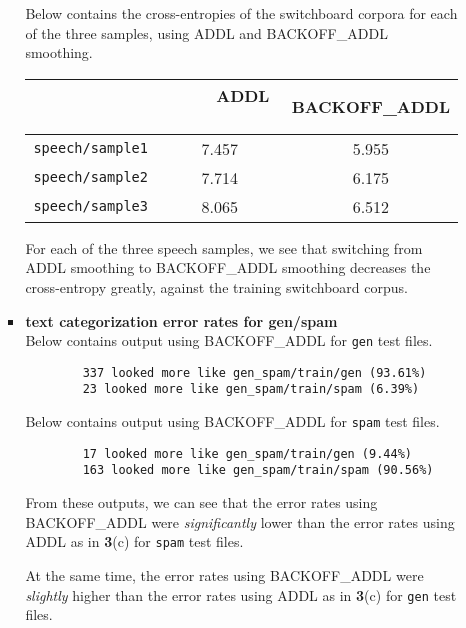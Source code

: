 \documentclass[11pt]{article}
\begin{document}
\begin{enumerate}
\begin{enumerate}[label=(\alph*)]
\begin{itemize}
				Below contains the cross-entropies of the switchboard corpora for each of the three samples, using ADDL and BACKOFF\_ADDL smoothing. \\

				\begin{center}\begin{tabular}{| r || c | c |}
					\hline
									& \ \ \ \ \ ADDL \ \ \ \ \ & BACKOFF\_ADDL \\
					\hline \hline
					\texttt{speech/sample1} & 7.457 & 5.955 		\\
					\texttt{speech/sample2} & 7.714 & 6.175 		\\
					\texttt{speech/sample3} & 8.065 & 6.512 		\\
					\hline
				
				\end{tabular}\end{center} \vspace{8pt}

				For each of the three speech samples, we see that switching from ADDL smoothing to BACKOFF\_ADDL smoothing decreases the cross-entropy greatly, against the training switchboard corpus.

			\item[] \hspace{-24pt} 
				\textbf{text categorization error rates for gen/spam} \vspace{4pt} \\
				Below contains output using BACKOFF\_ADDL for \texttt{gen} test files.
				\begin{lstlisting}
		337 looked more like gen_spam/train/gen (93.61%)
		23 looked more like gen_spam/train/spam (6.39%)
				\end{lstlisting}

				Below contains output using BACKOFF\_ADDL for \texttt{spam} test files.
				\begin{lstlisting}
		17 looked more like gen_spam/train/gen (9.44%)
		163 looked more like gen_spam/train/spam (90.56%)
				\end{lstlisting}
				From these outputs, we can see that the error rates using BACKOFF\_ADDL were \textit{significantly} lower than the error rates using ADDL as in \textbf{3}(c) for \texttt{spam} test files. \vspace{4pt}

				At the same time, the error rates using BACKOFF\_ADDL were \textit{slightly} higher than the error rates using ADDL as in \textbf{3}(c) for \texttt{gen} test files. \vspace{4pt}


\end{itemize}
\end{enumerate}
\end{enumerate}
\end{document}
